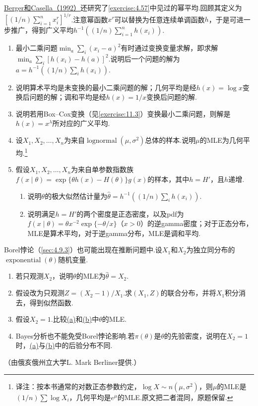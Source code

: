 \begin{exercise}\label{exercise:7.16}
\hyperref[bib:source26]{Berger和Casella（1992）}还研究了\autoref{exercise:4.57}中见过的幂平均.回顾其定义为$[(1/n)\sum_{i=1}^nx_i^r]^{1/r}$.注意幂函数$x^r$可以替换为任意连续单调函数$h$，于是可进一步推广，得到广义平均$h^{-1}((1/n)\sum_{i=1}^nh(x_i))$.
\begin{enumerate}[label=(\alph*)]
\item 最小二乘问题$\min_a\sum_i(x_i-a)^2$有时通过变换变量求解，即求解$\min_a\sum_i[h(x_i)-h(a)]^2$.说明后一个问题的解为$a=h^{-1}((1/n)\sum_i h(x_i))$.
\item 说明算术平均是未变换的最小二乘问题的解；几何平均是经$h(x)=\log x$变换后问题的解；调和平均是经$h(x)=1/x$变换后问题的解.
\item 说明若用Box--Cox变换（见\autoref{exercise:11.3}）变换最小二乘问题，则解是$h(x)=x^\lambda$所对应的广义平均.
\item 设$X_1,X_2,\ldots,X_n$为来自$\operatorname{lognormal}(\mu,\sigma^2)$总体的样本.说明$\mu$的MLE为几何平均.\footnote{译注：按本书通常的对数正态参数约定，$\log X\sim n(\mu,\sigma^2)$，则$\mu$的MLE是$(1/n)\sum\log X_i$，几何平均是$e^\mu$的MLE.原文把二者混同，原题保留.}
\item 假设$X_1,X_2,\ldots,X_n$为来自单参数指数族$f(x\mid\theta)=\exp\{\theta h(x)-H(\theta)\}g(x)$的样本，其中$h=H'$，且$h$递增.
\begin{enumerate}[label=(\roman*)]
\item 说明$\theta$的极大似然估计量为$\widehat\theta=h^{-1}((1/n)\sum_i h(x_i))$.
\item 说明满足$h=H'$的两个密度是正态密度，以及pdf为$f(x\mid\theta)=\theta x^{-2}\exp\{-\theta/x\}$（$x>0$）的逆gamma密度；对于正态分布，MLE是算术平均，对于逆gamma分布，MLE是调和平均.
\end{enumerate}
\end{enumerate}
\end{exercise}
\begin{exercise}\label{exercise:7.17}
Borel悖论（\autoref{sec:4.9.3}）也可能出现在推断问题中.设$X_1$和$X_2$为独立同分布的$\operatorname{exponential}(\theta)$随机变量.
\begin{enumerate}[label=(\alph*)]
\item{}\label{itm:exercise:7.17:a} 若只观测$X_2$，说明$\theta$的MLE为$\widehat\theta=X_2$.
\item{}\label{itm:exercise:7.17:b} 假设改为只观测$Z=(X_2-1)/X_1$.求$(X_1,Z)$的联合分布，并将$X_1$积分消去，得到似然函数.
\item 假设$X_2=1$.比较\hyperref[itm:exercise:7.17:a]{(a)}和\hyperref[itm:exercise:7.17:b]{(b)}中$\theta$的MLE.
\item Bayes分析也不能免受Borel悖论影响.若$\pi(\theta)$是$\theta$的先验密度，说明在$X_2=1$时，\hyperref[itm:exercise:7.17:a]{(a)}与\hyperref[itm:exercise:7.17:b]{(b)}中的后验分布不同.
\end{enumerate}
（由俄亥俄州立大学L. Mark Berliner提供.）
\end{exercise}
